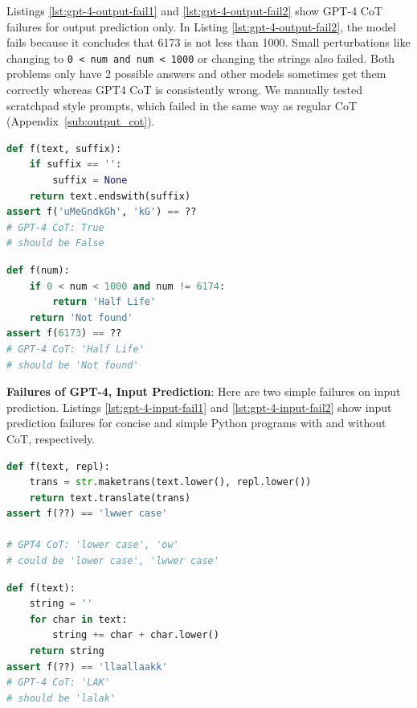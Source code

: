 \documentclass{article}
\begin{document}
Listings \ref{lst:gpt-4-output-fail1} and \ref{lst:gpt-4-output-fail2} show GPT-4 CoT failures for output prediction only. In Listing \ref{lst:gpt-4-output-fail2}, the model fails because it concludes that 6173 is not less than 1000. Small perturbations like changing to \texttt{0 < num and num < 1000} or changing the strings also failed. Both problems only have 2 possible answers and other models sometimes get them correctly whereas GPT4 CoT is consistently wrong. We manually tested scratchpad \cite{nye2021show} style prompts, which failed in the same way as regular CoT (Appendix~\ref{sub:output_cot}). 

\begin{minipage}{.48\textwidth}
\begin{lstlisting}[caption=GPT-4 CoT output,label={lst:gpt-4-output-fail1}, breaklines=true, language=python]
def f(text, suffix):
    if suffix == '':
        suffix = None
    return text.endswith(suffix)
assert f('uMeGndkGh', 'kG') == ??
# GPT-4 CoT: True
# should be False
\end{lstlisting}
\end{minipage}\hfill
\begin{minipage}{.48\textwidth}
\begin{lstlisting}[caption=GPT-4 CoT output,label={lst:gpt-4-output-fail2}, breaklines=true, language=python]
def f(num):
    if 0 < num < 1000 and num != 6174:
        return 'Half Life'
    return 'Not found'
assert f(6173) == ??
# GPT-4 CoT: 'Half Life'
# should be 'Not found'
\end{lstlisting}
\end{minipage}

\textbf{Failures of GPT-4, Input Prediction}: Here are two simple failures on input prediction. Listings \ref{lst:gpt-4-input-fail1} and \ref{lst:gpt-4-input-fail2} show input prediction failures for concise and simple Python programs with and without CoT, respectively.

\begin{minipage}{.48\textwidth}
\begin{lstlisting}[caption=GPT-4 CoT input,label={lst:gpt-4-input-fail1}, breaklines=true, language=python]
def f(text, repl):
    trans = str.maketrans(text.lower(), repl.lower())
    return text.translate(trans)
assert f(??) == 'lwwer case'

# GPT4 CoT: 'lower case', 'ow'
# could be 'lower case', 'lwwer case'
\end{lstlisting}
\end{minipage}\hfill
\begin{minipage}{.48\textwidth}
\begin{lstlisting}[caption=GPT-4 CoT input,label={lst:gpt-4-input-fail2}, breaklines=true, language=python]
def f(text):
    string = ''
    for char in text:
        string += char + char.lower()
    return string
assert f(??) == 'llaallaakk'
# GPT-4 CoT: 'LAK'
# should be 'lalak'
\end{lstlisting}
\end{minipage}
\end{document}
